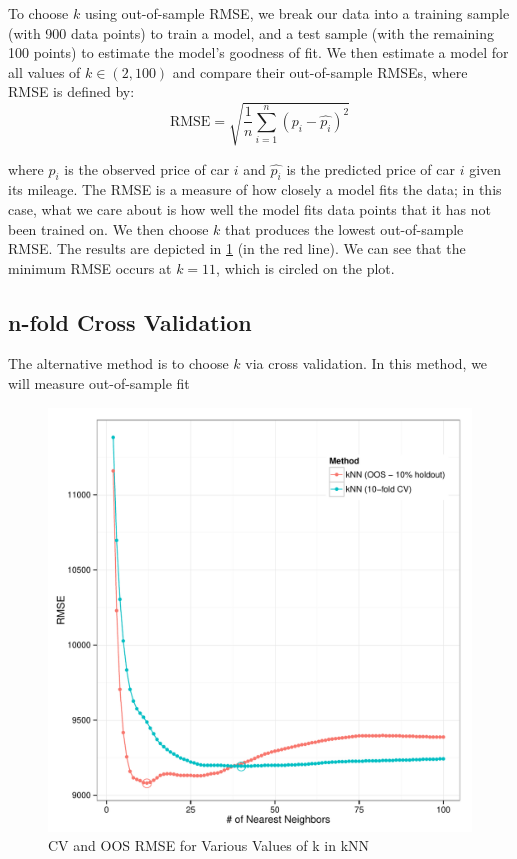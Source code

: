 \documentclass[11pt, fleqn, titlepage]{article}
\begin{document}
To choose \(k\) using out-of-sample RMSE, we break our data into a training sample (with 900 data points) to train a model, and a test sample (with the remaining 100 points) to estimate the model's goodness of fit. We then estimate a model for all values of \(k \in (2,100)\) and compare their out-of-sample RMSEs, where RMSE is defined by:
\[ \text{RMSE} = \sqrt{\frac{1}{n} \sum_{i=1}^{n} \left( p_i - \hat{p_i} \right)^2} \]

where \(p_i\) is the observed price of car \(i\) and \(\hat{p_i}\) is the predicted price of car \(i\) given its mileage. The RMSE is a measure of how closely a model fits the data; in this case, what we care about is how well the model fits data points that it has not been trained on. We then choose \(k\) that produces the lowest out-of-sample RMSE. The results are depicted in \cref{fig:sweep} (in the red line). We can see that the minimum RMSE occurs at \(k=11\), which is circled on the plot.

\subsection{n-fold Cross Validation}

The alternative method is to choose \(k\) via cross validation. In this method, we will measure out-of-sample fit 

\begin{figure}[!htb]
  \centering
  \includegraphics[scale=.5]{sweep_kknn.pdf}
  \caption{CV and OOS RMSE for Various Values of k in kNN}
  \label{fig:sweep}
\end{figure}
\end{document}
